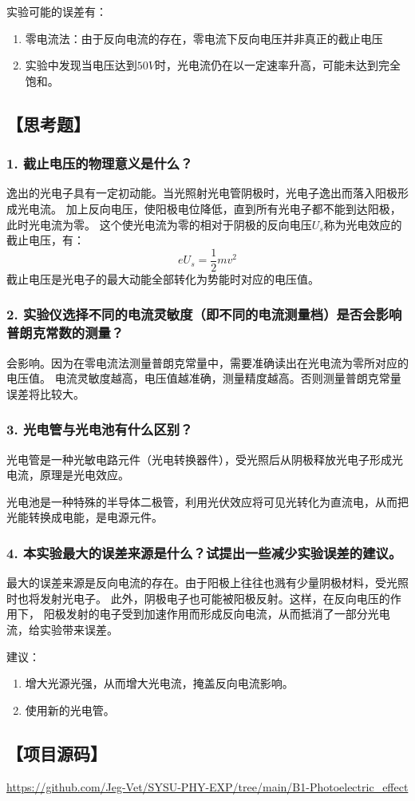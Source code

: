 \documentclass[12pt,a4paper,UTF8]{ctexart}
\begin{document}
实验可能的误差有：
\begin{enumerate}[label=\arabic*.]
    \item 零电流法：由于反向电流的存在，零电流下反向电压并非真正的截止电压
    \item 实验中发现当电压达到$50V$时，光电流仍在以一定速率升高，可能未达到完全饱和。
\end{enumerate}

  
\subsection*{【思考题】}
    \subsubsection*{1. 截止电压的物理意义是什么？}
    逸出的光电子具有一定初动能。当光照射光电管阴极时，光电子逸出而落入阳极形成光电流。
    加上反向电压，使阳极电位降低，直到所有光电子都不能到达阳极，此时光电流为零。
    这个使光电流为零的相对于阴极的反向电压$U_s$称为光电效应的截止电压，有：
    $$
        eU_s = \frac{1}{2}mv^2
    $$
    截止电压是光电子的最大动能全部转化为势能时对应的电压值。
    \subsubsection*{2. 实验仪选择不同的电流灵敏度（即不同的电流测量档）是否会影响普朗克常数的测量？}
    会影响。因为在零电流法测量普朗克常量中，需要准确读出在光电流为零所对应的电压值。
    电流灵敏度越高，电压值越准确，测量精度越高。否则测量普朗克常量误差将比较大。
    \subsubsection*{3. 光电管与光电池有什么区别？}
    光电管是一种光敏电路元件（光电转换器件），受光照后从阴极释放光电子形成光电流，原理是光电效应。
    
    光电池是一种特殊的半导体二极管，利用光伏效应将可见光转化为直流电，从而把光能转换成电能，是电源元件。
    \subsubsection*{4. 本实验最大的误差来源是什么？试提出一些减少实验误差的建议。}
    最大的误差来源是反向电流的存在。由于阳极上往往也溅有少量阴极材料，受光照时也将发射光电子。
    此外，阴极电子也可能被阳极反射。这样，在反向电压的作用下，
    阳极发射的电子受到加速作用而形成反向电流，从而抵消了一部分光电流，给实验带来误差。

    建议：
    \begin{enumerate}[label=\arabic*.]
        \item 增大光源光强，从而增大光电流，掩盖反向电流影响。
        \item 使用新的光电管。
    \end{enumerate}

\subsection*{【项目源码】}
\url{https://github.com/Jeg-Vet/SYSU-PHY-EXP/tree/main/B1-Photoelectric_effect}
\end{document}
